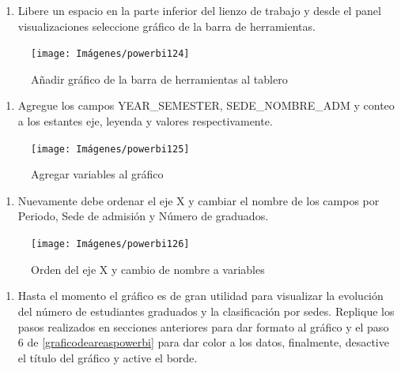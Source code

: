 \documentclass[
]{book}
\providecommand{\tightlist}{%
  \setlength{\itemsep}{0pt}\setlength{\parskip}{0pt}}
\begin{document}
\begin{enumerate}
\def\labelenumi{\arabic{enumi}.}
\tightlist
\item
  Libere un espacio en la parte inferior del lienzo de trabajo y desde el panel visualizaciones seleccione gráfico de la barra de herramientas.
\end{enumerate}

\begin{figure}

{\centering \texttt{[image: Imágenes/powerbi124]} 

}

\caption{Añadir gráfico de la barra de herramientas al tablero}\label{fig:paso1graficobarradeherramientas-fig}
\end{figure}

\begin{enumerate}
\def\labelenumi{\arabic{enumi}.}
\setcounter{enumi}{1}
\tightlist
\item
  Agregue los campos YEAR\_SEMESTER, SEDE\_NOMBRE\_ADM y conteo a los estantes eje, leyenda y valores respectivamente.
\end{enumerate}

\begin{figure}

{\centering \texttt{[image: Imágenes/powerbi125]} 

}

\caption{Agregar variables al gráfico}\label{fig:paso2graficobarradeherramientas-fig}
\end{figure}

\begin{enumerate}
\def\labelenumi{\arabic{enumi}.}
\setcounter{enumi}{2}
\tightlist
\item
  Nuevamente debe ordenar el eje X y cambiar el nombre de los campos por Periodo, Sede de admisión y Número de graduados.
\end{enumerate}

\begin{figure}

{\centering \texttt{[image: Imágenes/powerbi126]} 

}

\caption{Orden del eje X y cambio de nombre a variables}\label{fig:paso3graficobarradeherramientas-fig}
\end{figure}

\begin{enumerate}
\def\labelenumi{\arabic{enumi}.}
\setcounter{enumi}{3}
\tightlist
\item
  Hasta el momento el gráfico es de gran utilidad para visualizar la evolución del número de estudiantes graduados y la clasificación por sedes. Replique los pasos realizados en secciones anteriores para dar formato al gráfico y el paso 6 de \ref{graficodeareaspowerbi} para dar color a los datos, finalmente, desactive el título del gráfico y active el borde.
\end{enumerate}
\end{document}

